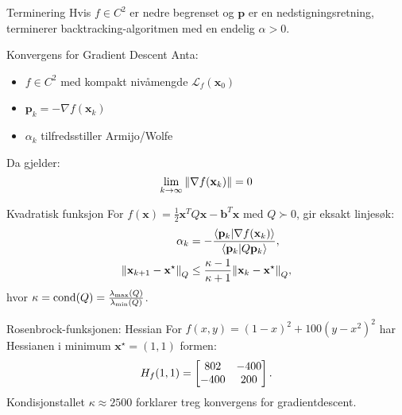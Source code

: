 \begin{lemma}{Terminering}{}
    Hvis \( f \in C^2 \) er nedre begrenset og \( \bm{p} \) er en nedstigningsretning, terminerer backtracking-algoritmen med en endelig \( \alpha > 0 \).
\end{lemma}

\begin{theorem}{Konvergens for Gradient Descent}{}
    Anta:
    \begin{itemize}
        \item \( f \in C^2 \) med kompakt nivåmengde \( \mathcal{L}_f(\bm{x}_0) \)
        \item \( \bm{p}_k = -\nabla f(\bm{x}_k) \)
        \item \( \alpha_k \) tilfredsstiller Armijo/Wolfe
    \end{itemize}
    Da gjelder:
    \begin{equation}
        \lim_{k \to \infty} \norm{\nabla f(\mathbf{x}_k)} = 0
    \end{equation}
\end{theorem}

\begin{example}{Kvadratisk funksjon}{}
    For \( f(\bm{x}) = \frac{1}{2}\bm{x}^T Q \bm{x} - \bm{b}^T \bm{x} \) med \( Q \succ 0 \), gir eksakt linjesøk:
    \begin{align*}
        \alpha_k                             & = -\frac{\ip{\bm{p}_k}{\nabla f(\bm{x}_k)}}{\ip{\bm{p}_k}{Q \bm{p}_k}}, \\
        \norm{\bm{x}_{k+1} - \bm{x}^\star}_Q & \leq \frac{\kappa - 1}{\kappa + 1} \norm{\bm{x}_k - \bm{x}^\star}_Q,
    \end{align*}
    hvor \( \kappa = \operatorname{cond}(Q) = \frac{\lambda_{\max}(Q)}{\lambda_{\min}(Q)} \).
\end{example}

\begin{example}{Rosenbrock-funksjonen: Hessian}{}
    For \( f(x,y) = (1-x)^2 + 100(y-x^2)^2 \) har Hessianen i minimum \( \bm{x}^\star = (1,1) \) formen:
    \begin{equation}
        H_f(1,1) = \begin{bmatrix}802 & -400 \\ -400 & 200\end{bmatrix}.
    \end{equation}
    Kondisjonstallet \( \kappa \approx 2500 \) forklarer treg konvergens for gradientdescent.
\end{example}